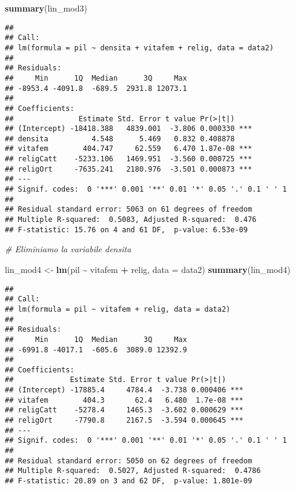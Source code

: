 \documentclass[
]{article}
\newenvironment{Shaded}{\begin{snugshade}}{\end{snugshade}}
\newcommand{\AttributeTok}[1]{\textcolor[rgb]{0.13,0.29,0.53}{#1}}
\newcommand{\CommentTok}[1]{\textcolor[rgb]{0.56,0.35,0.01}{\textit{#1}}}
\newcommand{\FunctionTok}[1]{\textcolor[rgb]{0.13,0.29,0.53}{\textbf{#1}}}
\newcommand{\NormalTok}[1]{#1}
\newcommand{\OtherTok}[1]{\textcolor[rgb]{0.56,0.35,0.01}{#1}}
\newcommand{\SpecialCharTok}[1]{\textcolor[rgb]{0.81,0.36,0.00}{\textbf{#1}}}
\begin{document}
\begin{Shaded}
\begin{Highlighting}[]
\FunctionTok{summary}\NormalTok{(lin\_mod3)}
\end{Highlighting}
\end{Shaded}

\begin{verbatim}
## 
## Call:
## lm(formula = pil ~ densita + vitafem + relig, data = data2)
## 
## Residuals:
##     Min      1Q  Median      3Q     Max 
## -8953.4 -4091.8  -689.5  2931.8 12073.1 
## 
## Coefficients:
##               Estimate Std. Error t value Pr(>|t|)    
## (Intercept) -18418.388   4839.001  -3.806 0.000330 ***
## densita          4.548      5.469   0.832 0.408878    
## vitafem        404.747     62.559   6.470 1.87e-08 ***
## religCatt    -5233.106   1469.951  -3.560 0.000725 ***
## religOrt     -7635.241   2180.976  -3.501 0.000873 ***
## ---
## Signif. codes:  0 '***' 0.001 '**' 0.01 '*' 0.05 '.' 0.1 ' ' 1
## 
## Residual standard error: 5063 on 61 degrees of freedom
## Multiple R-squared:  0.5083, Adjusted R-squared:  0.476 
## F-statistic: 15.76 on 4 and 61 DF,  p-value: 6.53e-09
\end{verbatim}

\begin{Shaded}
\begin{Highlighting}[]
\CommentTok{\# Eliminiamo la variabile densita}

\NormalTok{lin\_mod4 }\OtherTok{\textless{}{-}} \FunctionTok{lm}\NormalTok{(pil }\SpecialCharTok{\textasciitilde{}}\NormalTok{ vitafem }\SpecialCharTok{+}\NormalTok{ relig, }\AttributeTok{data =}\NormalTok{ data2)}
\FunctionTok{summary}\NormalTok{(lin\_mod4)}
\end{Highlighting}
\end{Shaded}

\begin{verbatim}
## 
## Call:
## lm(formula = pil ~ vitafem + relig, data = data2)
## 
## Residuals:
##     Min      1Q  Median      3Q     Max 
## -6991.8 -4017.1  -605.6  3089.0 12392.9 
## 
## Coefficients:
##             Estimate Std. Error t value Pr(>|t|)    
## (Intercept) -17885.4     4784.4  -3.738 0.000406 ***
## vitafem        404.3       62.4   6.480  1.7e-08 ***
## religCatt    -5278.4     1465.3  -3.602 0.000629 ***
## religOrt     -7790.8     2167.5  -3.594 0.000645 ***
## ---
## Signif. codes:  0 '***' 0.001 '**' 0.01 '*' 0.05 '.' 0.1 ' ' 1
## 
## Residual standard error: 5050 on 62 degrees of freedom
## Multiple R-squared:  0.5027, Adjusted R-squared:  0.4786 
## F-statistic: 20.89 on 3 and 62 DF,  p-value: 1.801e-09
\end{verbatim}
\end{document}

